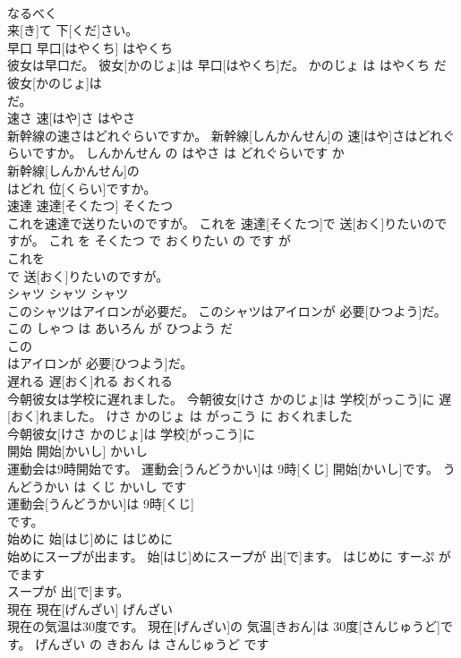 \documentclass[8pt]{extreport}
\begin{document}
\begin{CJK}{UTF8}{min}
\\	なるべく
\\	来[き]て 下[くだ]さい。		
\\	早口	早口[はやくち]	はやくち	
\\	彼女は早口だ。	彼女[かのじょ]は 早口[はやくち]だ。	かのじょ は はやくち だ	
\\	彼女[かのじょ]は
\\	だ。		
\\	速さ	速[はや]さ	はやさ	
\\	新幹線の速さはどれぐらいですか。	新幹線[しんかんせん]の 速[はや]さはどれぐらいですか。	しんかんせん の はやさ は どれぐらいです か	
\\	新幹線[しんかんせん]の
\\	はどれ 位[くらい]ですか。		
\\	速達	速達[そくたつ]	そくたつ	
\\	これを速達で送りたいのですが。	これを 速達[そくたつ]で 送[おく]りたいのですが。	これ を そくたつ で おくりたい の です が	
\\	これを
\\	で 送[おく]りたいのですが。		
\\	シャツ	シャツ	シャツ	
\\	このシャツはアイロンが必要だ。	このシャツはアイロンが 必要[ひつよう]だ。	この しゃつ は あいろん が ひつよう だ	
\\	この
\\	はアイロンが 必要[ひつよう]だ。		
\\	遅れる	遅[おく]れる	おくれる	
\\	今朝彼女は学校に遅れました。	今朝彼女[けさ かのじょ]は 学校[がっこう]に 遅[おく]れました。	けさ かのじょ は がっこう に おくれました	
\\	今朝彼女[けさ かのじょ]は 学校[がっこう]に
\\	開始	開始[かいし]	かいし	
\\	運動会は9時開始です。	運動会[うんどうかい]は 9時[くじ] 開始[かいし]です。	うんどうかい は くじ かいし です	
\\	運動会[うんどうかい]は 9時[くじ]
\\	です。		
\\	始めに	始[はじ]めに	はじめに	
\\	始めにスープが出ます。	始[はじ]めにスープが 出[で]ます。	はじめに すーぷ が でます	
\\	スープが 出[で]ます。		
\\	現在	現在[げんざい]	げんざい	
\\	現在の気温は30度です。	現在[げんざい]の 気温[きおん]は 30度[さんじゅうど]です。	げんざい の きおん は さんじゅうど です	

\end{CJK}
\end{document}
